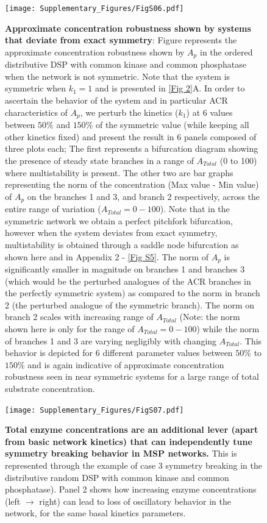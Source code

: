 \documentclass[16pt, a4paper]{article}
\begin{document}
\clearpage
\begin{figure}
    \centering
    \texttt{[image: Supplementary\_Figures/FigS06.pdf]}
    \caption{\textbf{Approximate concentration robustness shown by systems that deviate from exact symmetry}: Figure represents the approximate concentration robustness shown by $A_p$ in the ordered distributive DSP with common kinase and common phosphatase when the network is not symmetric. Note that the system is symmetric when $k_1=1$ and is presented in \cref{Fig 2}A. In order to ascertain the behavior of the system and in particular ACR characteristics of $A_p$, we perturb the kinetics ($k_1$) at 6 values between $50\%$ and $150\%$ of the symmetric value (while keeping all other kinetics fixed) and present the result in 6 panels composed of three plots each; The first represents a bifurcation diagram showing the presence of steady state branches in a range of $A_{Total}$ (0 to 100) where multistability is present. The other two are bar graphs representing the norm of the concentration (Max value - Min value) of $A_p$ on the branches 1 and 3, and branch 2 respectively, across the entire range of variation ($A_{Total}=0- 100$). Note that in the symmetric network we obtain a perfect pitchfork bifurcation, however when the system deviates from exact symmetry, multistability is obtained through a saddle node bifurcation as shown here and in Appendix 2 - \cref{Fig S5}. The norm of $A_p$ is significantly smaller in magnitude on branches 1 and branches 3 (which would be the perturbed analogues of the ACR branches in the perfectly symmetric system) as compared to the norm in branch 2 (the perturbed analogue of the symmetric branch). The norm on branch 2 scales with increasing range of $A_{Total}$ (Note: the norm shown here is only for the range of $A_{Total} = 0 - 100$) while the norm of branches 1 and 3 are varying negligibly with changing $A_{Total}$. This behavior is depicted for 6 different parameter values between $50\%$ to $150\%$ and is again indicative of approximate concentration robustness seen in near symmetric systems for a large range of total substrate concentration.}
    \label{Fig S6}
\end{figure}

\clearpage
\begin{figure}[ht!]
    \centering
    \texttt{[image: Supplementary\_Figures/FigS07.pdf]}
    \caption{\textbf{Total enzyme concentrations are an additional lever (apart from basic network kinetics) that can independently tune symmetry breaking behavior in MSP networks.} This is represented through the example of case 3 symmetry breaking in the distributive random DSP with common kinase and common phosphatase). Panel 2 shows how increasing enzyme concentrations (left $\longrightarrow$ right) can lead to loss of oscillatory behavior in the network, for the same basal kinetics parameters.}
    \label{Fig S7}
\end{figure}
\end{document}
